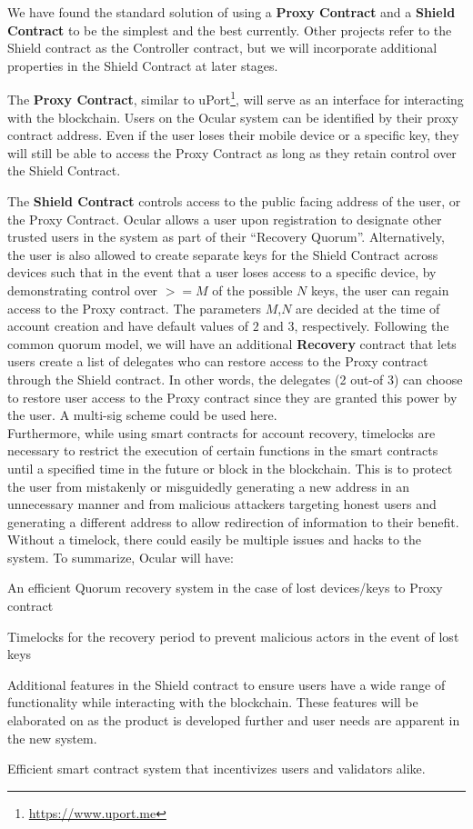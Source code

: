 \documentclass[12pt]{article}
\let\tempone\itemize
\let\temptwo\enditemize
\renewenvironment{itemize}{\tempone\addtolength{\itemsep}{-5pt}}{\temptwo}
\begin{document}
We have found the standard solution of using a \textbf{Proxy Contract} and a \textbf{Shield Contract} to be the simplest and the best currently. Other projects refer to the Shield contract as the Controller contract, but we will incorporate additional properties in the Shield Contract at later stages. 

The \textbf{Proxy Contract}, similar to uPort\footnote{\url{https://www.uport.me}}, will serve as an interface for interacting with the blockchain. Users on the Ocular system can be identified by their proxy contract address. Even if the user loses their mobile device or a specific key, they will still be able to access the Proxy Contract as long as they retain control over the Shield Contract.

The \textbf{Shield Contract} controls access to the public facing address of the user, or the Proxy Contract. Ocular allows a user upon registration to designate other trusted users in the system as part of their ``Recovery Quorum''. Alternatively, the user is also allowed to create separate keys for the Shield Contract across devices such that in the event that a user loses access to a specific device, by demonstrating control over $>= M$ of the possible $N$ keys, the user can regain access to the Proxy contract. The parameters $M$,$N$ are decided at the time of account creation and  have default values of $2$ and $3$, respectively. 
Following the common quorum model, we will have an additional \textbf{Recovery} contract that lets users create a list of delegates who can restore access to the Proxy contract through the Shield contract. In other words, the delegates (2 out-of 3) can choose to restore user access to the Proxy contract since they are granted this power by the user. A multi-sig scheme could be used here.\\

Furthermore, while using smart contracts for account recovery, timelocks are necessary to restrict the execution of certain functions in the smart contracts until a specified time in the future or block in the blockchain. This is to protect the user from mistakenly or misguidedly generating a new address in an unnecessary manner and from malicious attackers targeting honest users and generating a different address to allow redirection of information to their benefit. Without a timelock, there could easily be multiple issues and hacks to the system.
\newline
To summarize, Ocular will have:
\begin{itemize}
\item An efficient Quorum recovery system in the case of lost devices/keys to Proxy contract
\item Timelocks for the recovery period to prevent malicious actors in the event of lost keys
\item Additional features in the Shield contract to ensure users have a wide range of functionality while interacting with the blockchain. These features will be elaborated on as the product is developed further and user needs are apparent in the new system. 
\item Efficient smart contract system that incentivizes users and validators alike. 
\end{itemize} 
\end{document}
